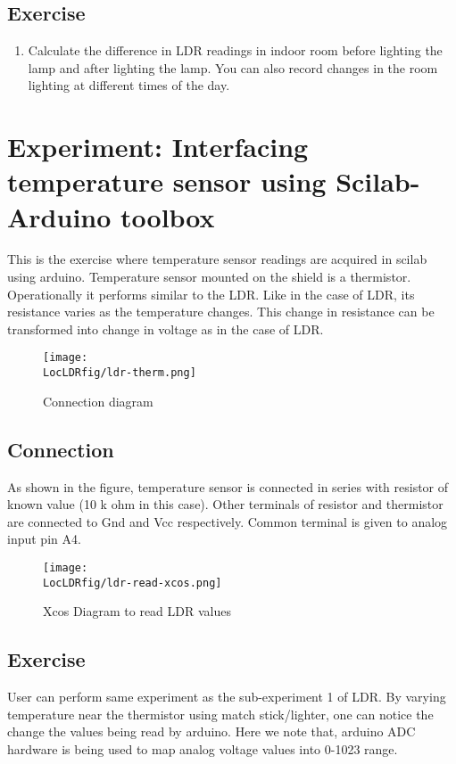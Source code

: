 \subsection{Exercise}
\begin{enumerate}
\item Calculate the difference in LDR readings in indoor room before lighting the lamp and after lighting the lamp. You can also record changes in the room lighting at different times of the day.
\end{enumerate}

\section{Experiment: Interfacing temperature sensor using Scilab-Arduino toolbox}
This is the exercise where temperature sensor readings are acquired in scilab using arduino. Temperature sensor mounted on the shield is a thermistor. Operationally it performs similar to the LDR. Like in the case of LDR, its resistance varies as the temperature changes. This change in resistance can be transformed into change in voltage as in the case of LDR.

\begin{figure}
\centering
\texttt{[image: \\LocLDRfig/ldr-therm.png]}
\caption{Connection diagram}
\label{fig:ldrtherm}
\end{figure}

\subsection{Connection}
As shown in the figure, temperature sensor is connected in series with resistor of known value  (10 k ohm in this case). Other terminals of resistor and thermistor are connected to  Gnd and Vcc respectively. Common terminal is given to analog input pin A4. 




\begin{figure}
\centering
\texttt{[image: \\LocLDRfig/ldr-read-xcos.png]}
\caption{Xcos Diagram to read LDR values}
\label{fig:xcos-ldr}
\end{figure}

%




\subsection{Exercise}
User can perform same experiment as the sub-experiment 1 of LDR. By varying temperature near the thermistor using match stick/lighter, one can notice the change the values being read by arduino. Here we note that, arduino ADC hardware is being used to map analog voltage values into 0-1023 range. 

